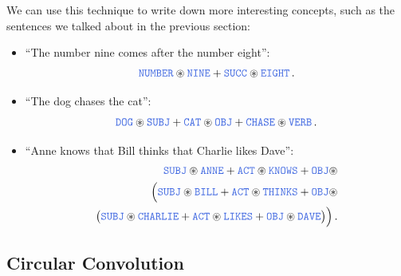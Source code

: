 \documentclass[10pt,letterpaper,oneside]{article}
\begin{document}
We can use this technique to write down more interesting concepts, such as the sentences we talked about in the previous section:
\begin{itemize}
	\item \enquote{The number nine comes after the number eight}:
	\begin{align*}
		\Obj{NUMBER} \CC \Obj{NINE} + \Obj{SUCC} \CC \Obj{EIGHT} \,.
	\end{align*}
	\item \enquote{The dog chases the cat}:
	\begin{align*}
		\Obj{DOG} \CC \Obj{SUBJ} + \Obj{CAT} \CC \Obj{OBJ} + \Obj{CHASE} \CC \Obj{VERB} \,.
	\end{align*}
	\item \enquote{Anne knows that Bill thinks that Charlie likes Dave}:
	\begin{align*}
	 	\Obj{SUBJ} \CC \Obj{ANNE} + \Obj{ACT} \CC \Obj{KNOWS} + \Obj{OBJ} \CC \\\Big(\Obj{SUBJ} \CC \Obj{BILL} + \Obj{ACT} \CC \Obj{THINKS} + \Obj{OBJ} \CC \\ \big(\Obj{SUBJ} \CC \Obj{CHARLIE} + \Obj{ACT} \CC \Obj{LIKES} + \Obj{OBJ} \CC \Obj{DAVE}\big)\Big) \,.
	\end{align*}
\end{itemize}


\subsection{Circular Convolution}
\end{document}
